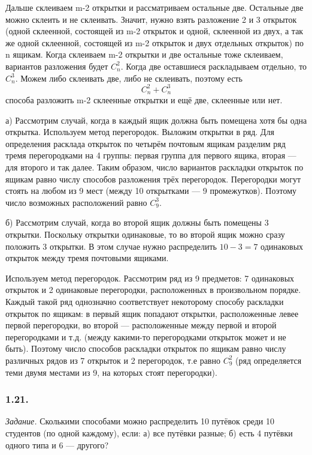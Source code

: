 \documentclass{book}
\begin{document}
Дальше склеиваем m-2 открытки и рассматриваем остальные две. Остальные две можно склеить и не склеивать. Значит, нужно взять разложение 2 и 3 открыток (одной склеенной, состоящей из m-2 открыток и одной, склеенной из двух, а так же одной склеенной, состоящей из m-2 открыток и двух отдельных открыток) по n ящикам. Когда склеиваем m-2 открытки и две остальные тоже склеиваем, вариантов разложения будет $C_n^2$. Когда две оставшиеся раскладываем отдельно, то $C_n^3$. Можем либо склеивать две, либо не склеивать, поэтому есть $$C_n^2+C_n^3$$ способа разложить m-2 склеенные открытки и ещё две, склеенные или нет.

а) Рассмотрим случай, когда в каждый ящик должна быть помещена хотя бы одна открытка. Используем метод перегородок. Выложим открытки в ряд. Для определения расклада открыток по четырём почтовым ящикам разделим ряд тремя перегородками на 4 группы: первая группа для первого ящика, вторая --- для второго и так далее. Таким образом, число вариантов раскладки открыток по ящикам равно числу способов разложения трёх перегородок. Перегородки могут стоять на любом из 9 мест (между 10 открытками --- 9 промежутков). Поэтому число возможных расположений равно $C_9^3$.

б) Рассмотрим случай, когда во второй ящик должны быть помещены 3 открытки. Поскольку открытки одинаковые, то во второй ящик можно сразу положить 3 открытки. В этом случае нужно распределить $10-3=7$ одинаковых открыток между тремя почтовыми ящиками.

Используем метод перегородок. Рассмотрим ряд из 9 предметов: 7 одинаковых открыток и 2 одинаковые перегородки, расположенных в произвольном порядке. Каждый такой ряд однозначно соответствует некоторому способу раскладки открыток по ящикам: в первый ящик попадают открытки, расположенные левее первой перегородки, во второй --- расположенные между первой и второй перегородками и т.д. (между какими-то перегородками открыток может и не быть). Поэтому число способов раскладки открыток по ящикам равно числу различных рядов из 7 открыток и 2 перегородок, т.е равно $C_9^2$ (ряд определяется теми двумя местами из 9, на которых стоят перегородки).

\subsubsection*{1.21.}

\textit{Задание.} Сколькими способами можно распределить 10 путёвок среди 10 студентов (по одной каждому), если: а) все путёвки разные; б) есть 4 путёвки одного типа и 6 --- другого?
\end{document}
